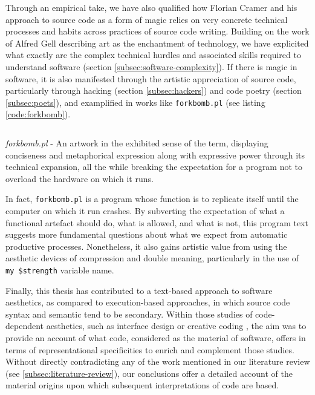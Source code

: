 Through an empirical take, we have also qualified how Florian Cramer and his approach to source code as a form of magic relies on very concrete technical processes and habits across practices of source code writing. Building on the work of Alfred Gell describing art as the enchantment of technology, we have explicited what exactly are the complex technical hurdles and associated skills required to understand software (section \autoref{subsec:software-complexity}). If there is magic in software, it is also manifested through the artistic appreciation of source code, particularly through hacking (section \autoref{subsec:hackers}) and code poetry (section \autoref{subsec:poets}), and examplified in works like \lstinline{forkbomb.pl} (see listing \autoref{code:forkbomb}).

\begin{listing}
    \inputminted{perl}{./corpus/forkbomb.pl}
    \caption{\emph{forkbomb.pl} - An artwork in the exhibited sense of the term, displaying conciseness and metaphorical expression along with expressive power through its technical expansion, all the while breaking the expectation for a program not to overload the hardware on which it runs.}
    \label{code:forkbomb}
\end{listing}

In fact, \lstinline{forkbomb.pl} is a program whose function is to replicate itself until the computer on which it run crashes. By subverting the expectation of what a functional artefact should do, what is allowed, and what is not, this program text suggests more fundamental questions about what we expect from automatic productive processes. Nonetheless, it also gains artistic value from using the aesthetic devices of compression and double meaning, particularly in the use of \lstinline{my $strength} variable name.

Finally, this thesis has contributed to a text-based approach to software aesthetics, as compared to execution-based approaches, in which source code syntax and semantic tend to be secondary. Within those studies of code-dependent aesthetics, such as interface design \citep{fishwick_aesthetic_2002} or creative coding \citep{cox_aesthetic_2020}, the aim was to provide an account of what code, considered as the material of software, offers in terms of representational specificities to enrich and complement those studies. Without directly contradicting any of the work mentioned in our literature review (see \autoref{subsec:literature-review}), our conclusions offer a detailed account of the material origins upon which subsequent interpretations of code are based.

